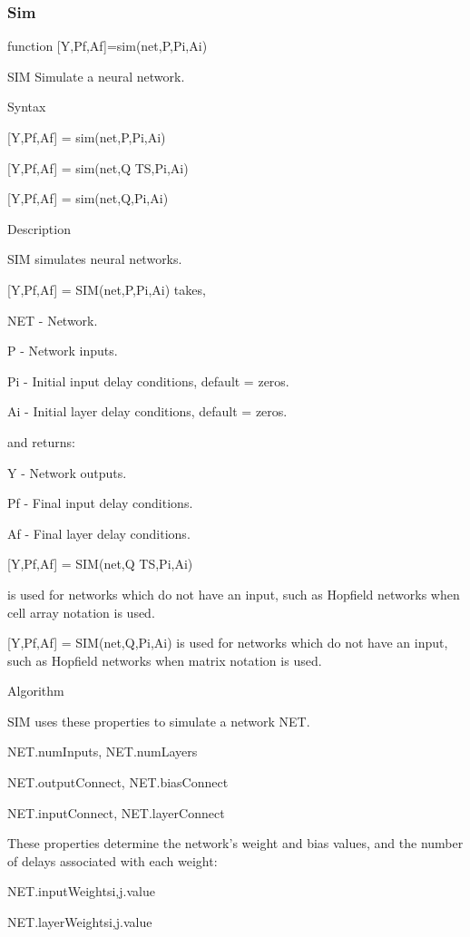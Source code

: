 \subsubsection{Sim}
function [Y,Pf,Af]=sim(net,P,Pi,Ai)

SIM Simulate a neural network.

   Syntax

     [Y,Pf,Af] = sim(net,P,Pi,Ai)

     [Y,Pf,Af] = sim(net,{Q TS},Pi,Ai)

     [Y,Pf,Af] = sim(net,Q,Pi,Ai)

   Description

     SIM simulates neural networks.

     [Y,Pf,Af] = SIM(net,P,Pi,Ai) takes,

       NET - Network.

       P   - Network inputs.

       Pi  - Initial input delay conditions, default = zeros.

       Ai  - Initial layer delay conditions, default = zeros.

     and returns:

       Y   - Network outputs.

       Pf  - Final input delay conditions.

       Af  - Final layer delay conditions.

     [Y,Pf,Af] = SIM(net,{Q TS},Pi,Ai)

     is used for networks which do not have an input, such
     as Hopfield networks when cell array notation is used.

     [Y,Pf,Af] = SIM(net,Q,Pi,Ai) is used for networks
     which do not have an input, such as Hopfield networks
     when matrix notation is used.

   Algorithm

     SIM uses these properties to simulate a network NET.

       NET.numInputs, NET.numLayers

       NET.outputConnect, NET.biasConnect

       NET.inputConnect, NET.layerConnect

     These properties determine the network's weight and bias values,
     and the number of delays associated with each weight:

       NET.inputWeights{i,j}.value

       NET.layerWeights{i,j}.value

